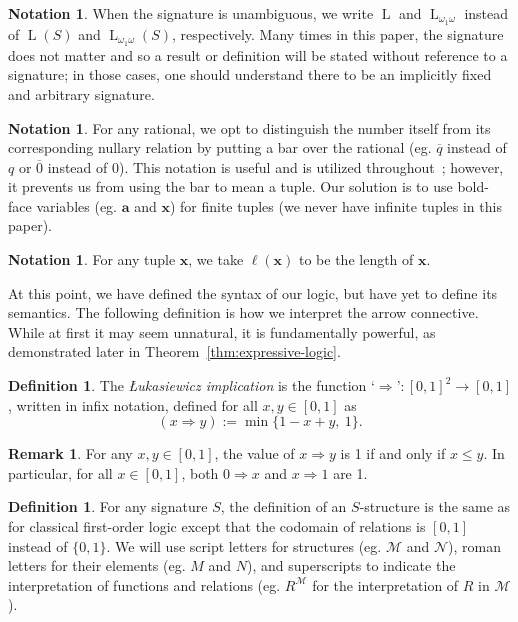 \documentclass{amsart}
\theoremstyle{definition}
\newtheorem{remark}[theorem]{Remark}
\newtheorem{definition}[theorem]{Definition}
\newtheorem{notation}[theorem]{Notation}
\numberwithin{equation}{theorem}
\newcommand{\V}{\mathbf}
\newcommand{\rat}[1]{{\overline{#1}}}
\newcommand{\narrow}[1]{\xrightarrow{#1}}
\renewcommand{\to}{\narrow{}}
\newcommand{\len}{\ell}
\newcommand{\baselang}{\operatorname{L}}
\newcommand{\lang}{\baselang_{\omega_1\omega}}
\begin{document}
\begin{notation}
  When the signature is unambiguous, we write $\baselang$ and $\lang$ instead of $\baselang(S)$ and $\lang(S)$, respectively.
  Many times in this paper, the signature does not matter and so a result or definition will be stated without reference to a signature; in those cases, one should understand there to be an implicitly fixed and arbitrary signature.
\end{notation}
\begin{notation}
  For any rational, we opt to distinguish the number itself from its corresponding nullary relation by putting a bar over the rational (eg. $\rat q$ instead of $q$ or $\rat 0$ instead of $0$).
  This notation is useful and is utilized throughout~\cite{hajek1998metamathematics}; however, it prevents us from using the bar to mean a tuple.
  Our solution is to use bold-face variables (eg. $\V a$ and $\V x$) for finite tuples (we never have infinite tuples in this paper).
\end{notation}
\begin{notation}
  For any tuple $\V x$, we take $\len(\V x)$ to be the length of $\V x$.
\end{notation}
At this point, we have defined the syntax of our logic, but have yet to define its semantics.
The following definition is how we interpret the arrow connective.
While at first it may seem unnatural, it is fundamentally powerful, as demonstrated later in Theorem~\ref{thm:expressive-logic}.
\begin{definition}
  The \emph{{\L}ukasiewicz implication} is the function `$\Rightarrow$'$:[0,1]^2\to[0,1]$, written in infix notation, defined for all $x,y\in[0,1]$ as
  \[
    (x\Rightarrow y) := \min\{1-x+y,\ 1\}.
  \]
\end{definition}
\begin{remark}
  For any $x,y\in[0,1]$, the value of $x\Rightarrow y$ is 1 if and only if $x\leq y$.
  In particular, for all $x\in[0,1]$, both $0\Rightarrow x$ and $x\Rightarrow 1$ are 1.
\end{remark}
\begin{definition}
  For any signature $S$, the definition of an $S$-structure is the same as for classical first-order logic except that the codomain of relations is $[0,1]$ instead of $\{0,1\}$.
  We will use script letters for structures (eg. $\mathcal M$ and $\mathcal N$), roman letters for their elements (eg. $M$ and $N$), and superscripts to indicate the interpretation of functions and relations (eg. $R^\mathcal M$ for the interpretation of $R$ in $\mathcal M$).
\end{definition}
\end{document}
